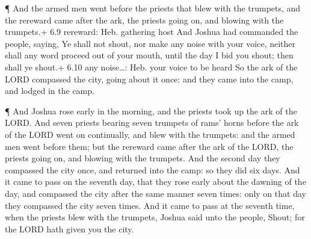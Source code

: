  ¶ And the armed men went before the priests that blew with
the trumpets, and the rereward came after the ark, the priests going on,
and blowing with the trumpets.+ 6.9 rereward: Heb. gathering host
 And Joshua had commanded the people, saying, Ye shall not
shout, nor make any noise with your voice, neither shall any word
proceed out of your mouth, until the day I bid you shout; then shall ye
shout.+ 6.10 any noise\ldots: Heb. your voice to be heard 
So the ark of the LORD compassed the city, going about it once: and they
came into the camp, and lodged in the camp.

 ¶ And Joshua rose early in the morning, and the priests
took up the ark of the LORD.  And seven priests bearing
seven trumpets of rams' horns before the ark of the LORD went on
continually, and blew with the trumpets: and the armed men went before
them; but the rereward came after the ark of the LORD, the priests going
on, and blowing with the trumpets.  And the second day they
compassed the city once, and returned into the camp: so they did six
days.  And it came to pass on the seventh day, that they
rose early about the dawning of the day, and compassed the city after
the same manner seven times: only on that day they compassed the city
seven times.  And it came to pass at the seventh time, when
the priests blew with the trumpets, Joshua said unto the people, Shout;
for the LORD hath given you the city.

